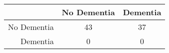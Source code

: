 \begin{table}[ht]
\centering
\begin{tabular}{r|c|c}
  \hline
 & No Dementia & Dementia \\ 
  \hline
No Dementia & 43 & 37 \\ 
  Dementia & 0 & 0 \\ 
   \hline
\end{tabular}
\end{table}
